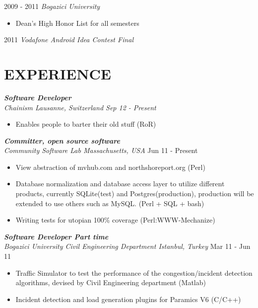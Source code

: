 \documentclass[line, margin]{res}
\begin{document}
\begin{resume}
				2009 - 2011 {\sl Bogazici University }
				\begin{itemize} \itemsep -2pt
					\item Dean's High Honor List for all semesters	
				\end{itemize}

				2011 {\sl Vodafone Android Idea Contest Final} \\
 
\section{EXPERIENCE}
				{\sl \textbf{Software Developer} \\
				Chainism Lausanne, Switzerland \hfill Sep 12 - Present }
				\vspace{-0.3cm} \\
				\begin{itemize} \itemsep -2pt
					\item Enables people to barter their old stuff (RoR)
				\end{itemize}
 
				{\sl \textbf{Committer, open source software} \\ Community Software Lab Massachusetts, USA} \hfill Jun 11 - Present \\
				\vspace{-0.3cm}
				\begin{itemize} \itemsep -2pt
					\item View abstraction of mvhub.com and northshoreport.org (Perl)
					\item Database normalization and database access layer to utilize different products, currently SQLite(test) and Postgres(production), production will be extended to use others such as MySQL. (Perl + SQL + bash)
					\item Writing tests for utopian 100\% coverage (Perl:WWW-Mechanize)
				\end{itemize}

				{\sl \textbf{Software Developer Part time} \\ Bogazici University Civil Engineering Department Istanbul, Turkey} \hfill Mar 11 - Jun 11 \\
				\vspace{-0.3cm}
				\begin{itemize} \itemsep -2pt
					\item Traffic Simulator to test the performance of the congestion/incident detection algorithms, devised by Civil Engineering department (Matlab)
					\item Incident detection and load generation plugins for Paramics V6 (C/C++)
				\end{itemize}


\end{resume}
\end{document}
